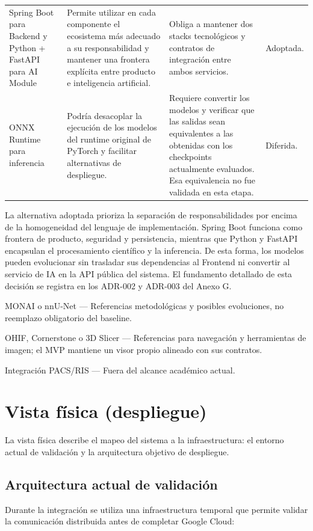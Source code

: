{\begin{longtable}{>{\raggedright\arraybackslash}p{} >{\raggedright\arraybackslash}p{} >{\raggedright\arraybackslash}p{} >{\raggedright\arraybackslash}p{}}
Spring Boot para Backend y Python + FastAPI para AI Module & Permite utilizar en cada componente el ecosistema más adecuado a su responsabilidad y mantener una frontera explícita entre producto e inteligencia artificial. & Obliga a mantener dos stacks tecnológicos y contratos de integración entre ambos servicios. & Adoptada. \\
ONNX Runtime para inferencia & Podría desacoplar la ejecución de los modelos del runtime original de PyTorch y facilitar alternativas de despliegue. & Requiere convertir los modelos y verificar que las salidas sean equivalentes a las obtenidas con los checkpoints actualmente evaluados. Esa equivalencia no fue validada en esta etapa. & Diferida. \\
\hline
\end{longtable}
}

La alternativa adoptada prioriza la separación de responsabilidades por encima de la homogeneidad del lenguaje de implementación. Spring Boot funciona como frontera de producto, seguridad y persistencia, mientras que Python y FastAPI encapsulan el procesamiento científico y la inferencia. De esta forma, los modelos pueden evolucionar sin trasladar sus dependencias al Frontend ni convertir al servicio de IA en la API pública del sistema. El fundamento detallado de esta decisión se registra en los ADR-002 y ADR-003 del Anexo G.

MONAI o nnU-Net — Referencias metodológicas y posibles evoluciones, no reemplazo obligatorio del baseline.

OHIF, Cornerstone o 3D Slicer — Referencias para navegación y herramientas de imagen; el MVP mantiene un visor propio alineado con sus contratos.

Integración PACS/RIS — Fuera del alcance académico actual.

\section{Vista física (despliegue)}

La vista física describe el mapeo del sistema a la infraestructura: el entorno actual de validación y la arquitectura objetivo de despliegue.

\subsection{Arquitectura actual de validación}

Durante la integración se utiliza una infraestructura temporal que permite validar la comunicación distribuida antes de completar Google Cloud:

